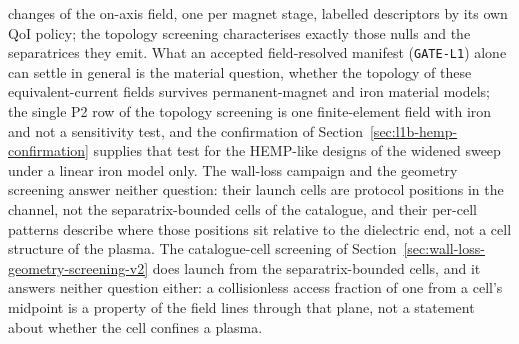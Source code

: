 \documentclass[11pt]{article}
\begin{document}
changes of the on-axis field, one per magnet stage, labelled descriptors by its
own QoI policy; the topology screening characterises exactly those nulls and
the separatrices they emit. What an accepted field-resolved manifest
(\texttt{GATE-L1}) alone can settle in general is the material question, whether the
topology of these equivalent-current fields survives permanent-magnet and iron
material models; the single P2 row of the topology screening is one
finite-element field with iron and not a sensitivity test, and the confirmation
of Section~\ref{sec:l1b-hemp-confirmation} supplies that test for the HEMP-like
designs of the widened sweep under a linear iron model only. The wall-loss
campaign and the geometry screening answer neither question: their launch cells
are protocol positions in the channel, not the separatrix-bounded cells of the
catalogue, and their per-cell patterns describe where those positions sit
relative to the dielectric end, not a cell structure of the plasma. The
catalogue-cell screening of Section~\ref{sec:wall-loss-geometry-screening-v2}
does launch from the separatrix-bounded cells, and it answers neither question
either: a collisionless access fraction of one from a cell's midpoint is a
property of the field lines through that plane, not a statement about whether
the cell confines a plasma.
\end{document}
